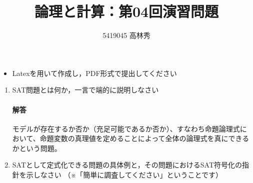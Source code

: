 \documentclass[dvipdfmx]{jsarticle}
\def\NO{04}
\def\LECTURENAME{論理と計算}
\begin{document}
\title{\LECTURENAME{}：第\NO{}回演習問題}

\author{5419045 高林秀}

\date{}
\maketitle

\begin{itemize}
\item Latexを用いて作成し，PDF形式で提出してください
\end{itemize}


\vspace*{\baselineskip}

\begin{enumerate}\setlength{\itemsep}{\baselineskip}

\item SAT問題とは何か，一言で端的に説明しなさい
\paragraph{解答}\par
モデルが存在するか否か（充足可能であるか否か）、すなわち命題論理式において、命題変数の真理値を定めることによって全体の論理式を真にできるかという問題。

\item SATとして定式化できる問題の具体例と，その問題におけるSAT符号化の指針を示しなさい
  （※「簡単に調査してください」ということです）

\end{enumerate}
\end{document}
